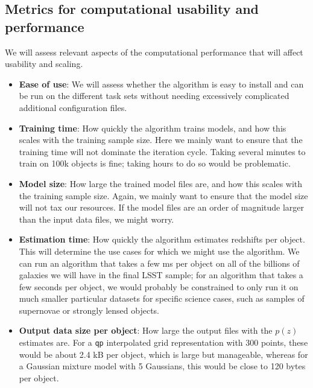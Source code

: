 \documentclass[11pt,twoside,letterpaper,onecolumn,english]{article}
\begin{document}
\subsection{Metrics for computational usability and performance}

We will assess relevant aspects of the computational performance that
will affect usability and scaling. 

\begin{itemize}
\item{\textbf{Ease of use}: We will assess whether the algorithm is easy to
    install and can be run on the different task sets without needing
    excessively complicated additional configuration files.}
\item{\textbf{Training time}: How quickly the algorithm trains models,
    and how this scales with the training sample size. Here we
    mainly want to ensure that the training time will not dominate the
    iteration cycle. Taking several minutes to train on 100k objects
    is fine; taking hours to do so would be problematic.}
\item{\textbf{Model size}: How large the trained model files are,
    and how this scales with the training sample size. Again, we
    mainly want to ensure that the model size will not tax our resources.
    If the model files are an order of magnitude larger than the input
    data files, we might worry.}
\item{\textbf{Estimation time}: How quickly the algorithm estimates
    redshifts per object. This will determine the use cases for
    which we might use the algorithm. We can run an algorithm that
    takes a few ms per object on all of the billions of galaxies we
    will have in the final LSST sample; for an algorithm that takes a
    few seconds per object, we would probably be constrained to only
    run it on much smaller particular datasets for specific science
    cases, such as samples of supernovae or strongly lensed objects.}
\item{\textbf{Output data size per object}: How large the output
    files with the $p(z)$ estimates are. For a \texttt{qp}
    interpolated grid representation with 300 points, these
    would be about 2.4 kB per object, which is large but manageable,
    whereas for a Gaussian mixture model with 5 Gaussians, this would
    be close to 120 bytes per object.}
\end{itemize}


\end{document}

